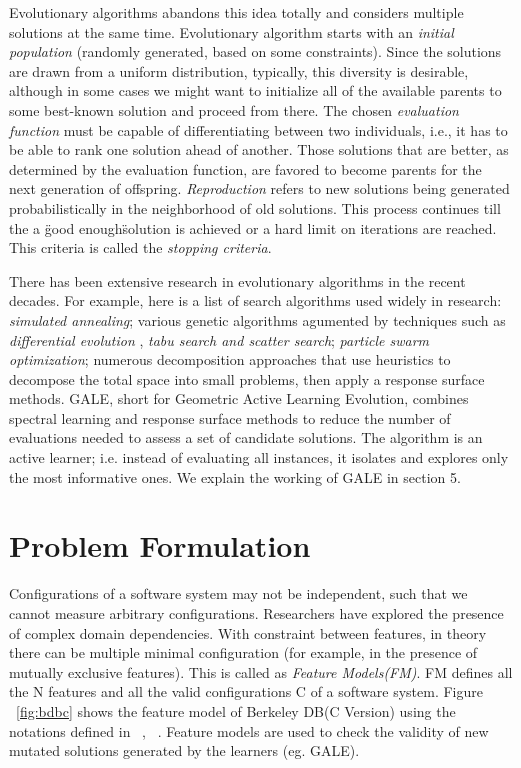 \documentclass{sig-alternative}
\begin{document}
Evolutionary algorithms abandons this idea totally and considers multiple solutions at the same time. Evolutionary algorithm starts with an \textit{initial population} (randomly generated, based on some constraints). Since the solutions are drawn from a uniform distribution, typically, this diversity is desirable, although in some cases we might want to initialize all of the available parents to some best-known solution and proceed from there. The chosen \textit{evaluation function} must be capable of differentiating
between two individuals, i.e., it has to be able to rank one solution ahead
of another. Those solutions that are better, as determined by the evaluation
function, are favored to become parents for the next generation of offspring. 
\textit{Reproduction} refers to  new solutions being generated probabilistically in the neighborhood of old solutions. This process continues till the a \"good enough\" solution is achieved or a hard limit on iterations are reached. This criteria is called the \textit{stopping criteria}.
    
    There has been extensive research in evolutionary algorithms in the recent decades. For example, here is a list of search algorithms used widely in research: \textit{simulated annealing}\cite{bell2013limited, menzies2007business}; various genetic algorithms\cite{goldberg1979complexity} agumented by techniques such as \textit{differential evolution} \cite{storn1997differential}, \textit{tabu search and scatter search}\cite{nebro2008abyss, molina2007sspmo, glover1986general, beausoleil2006moss}; \textit{particle swarm optimization}\cite{pan2008particle}; numerous decomposition approaches that use heuristics to decompose the total space into small problems, then apply a response surface methods\cite{krall2014gale, zuluaga2013active}. GALE, short for Geometric Active Learning Evolution,
combines spectral learning and response surface methods
to reduce the number of evaluations needed to assess a set
of candidate solutions. The algorithm is an active learner;
i.e. instead of evaluating all instances, it isolates and explores
only the most informative ones. We explain the working of GALE in section 5.


\section{Problem Formulation}


    Configurations of a software system may not be independent, such that we cannot measure arbitrary configurations. Researchers have explored the presence of complex domain dependencies. With constraint between features, in theory there can be multiple minimal configuration (for example, in the presence of mutually exclusive features). This is called as \textit{Feature Models(FM)}. FM defines all the N features and all the valid configurations C of a software system. Figure ~\ref{fig:bdbc}  shows the feature model of Berkeley DB(C Version) using the notations defined in ~\cite{kang1990feature}, ~\cite{guo2012consistency}. Feature models are used to check the validity of new mutated solutions generated by the learners (eg. GALE).
    
\end{document}
